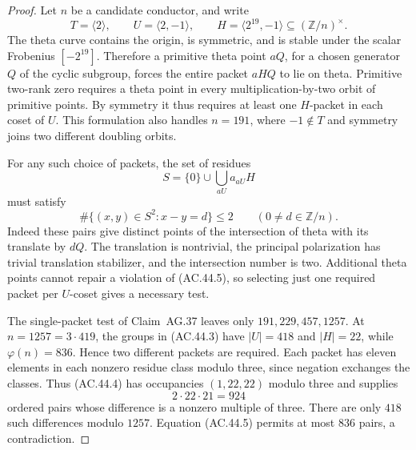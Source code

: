 \begin{proof}
Let \(n\) be a candidate conductor, and write
\[
 T=\langle2\rangle,\qquad
 U=\langle2,-1\rangle,\qquad
 H=\langle2^{19},-1\rangle
       \subseteq(\mathbb Z/n)^\times.
\tag{AC.44.3}
\]
The theta curve contains the origin, is symmetric, and is stable
under the scalar Frobenius \([-2^{19}]\). Therefore a primitive
theta point \(aQ\), for a chosen generator \(Q\) of the cyclic
subgroup, forces the entire packet \(aHQ\) to lie on theta.
Primitive two-rank zero requires a theta point in every
multiplication-by-two orbit of primitive points. By symmetry it
thus requires at least one \(H\)-packet in each coset of \(U\).
This formulation also handles \(n=191\), where \(-1\notin T\)
and symmetry joins two different doubling orbits.

For any such choice of packets, the set of residues
\[
                  S=\{0\}\cup\bigcup_{aU} a_{aU}H
\tag{AC.44.4}
\]
must satisfy
\[
 \#\{(x,y)\in S^2:x-y=d\}\le2
                 \qquad(0\ne d\in\mathbb Z/n).
\tag{AC.44.5}
\]
Indeed these pairs give distinct points of the intersection of
theta with its translate by \(dQ\). The translation is nontrivial,
the principal polarization has trivial translation stabilizer,
and the intersection number is two. Additional theta points cannot
repair a violation of (AC.44.5), so selecting just one required
packet per \(U\)-coset gives a necessary test.

The single-packet test of Claim~AG.37 leaves only
\(191,229,457,1257\). At \(n=1257=3\cdot419\), the groups
in (AC.44.3) have \(|U|=418\) and \(|H|=22\), while
\(\varphi(n)=836\). Hence two different packets are required.
Each packet has eleven elements in each nonzero residue class
modulo three, since negation exchanges the classes. Thus (AC.44.4)
has occupancies \((1,22,22)\) modulo three and supplies
\[
                   2\cdot22\cdot21=924
\]
ordered pairs whose difference is a nonzero multiple of three.
There are only \(418\) such differences modulo \(1257\).
Equation (AC.44.5) permits at most \(836\) pairs, a contradiction.


\end{proof}
